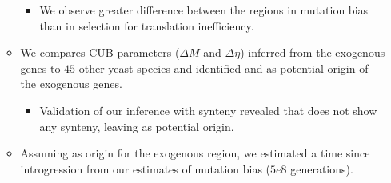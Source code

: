 \documentclass[12pt]{article}
\begin{document}
\begin{itemize}
\begin{itemize}
\begin{itemize}
			\item We observe greater difference between the regions in mutation bias than in selection for translation inefficiency.
		\end{itemize}
		\item We compares CUB parameters ($\Delta M$ and $\Delta \eta$) inferred from the exogenous genes to $45$ other yeast species and identified \gossypii and \dubl as potential origin of the exogenous genes.  
		\begin{itemize}
			\item Validation of our inference with synteny revealed that \dubl does not show any synteny, leaving \gossypii as potential origin.
		\end{itemize}
		\item Assuming \gossypii as origin for the exogenous region, we estimated a time since introgression from our estimates of mutation bias ($5e8$ generations).
	\end{itemize}
\end{itemize}
\end{document}
